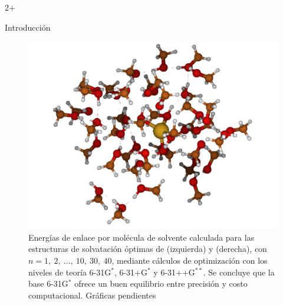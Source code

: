 \documentclass[final]{beamer}
\newlength{\sepwidth}
\newlength{\colwidth}
\begin{document}
\begin{frame}[t]
\begin{columns}[t]
\begin{column}{2\colwidth+\sepwidth}
\begin{alertblock}{Introducción}
\begin{figure}[H]
\begin{minipage}[b]{0.25\textwidth}
					\end{minipage}
					\hfill
					\begin{minipage}[b]{0.25\textwidth}
						\centering
						\includegraphics[width=\textwidth]{logos/Cu-40CH4O.png}
					\end{minipage}

					\caption{Energías de enlace por molécula de solvente calculada para las estructuras de solvatación óptimas de  (izquierda) y  (derecha), con $n = 1,\ 2,\ \ldots,\ 10,\ 30,\ 40$, mediante cálculos de optimización con los niveles de teoría 6-31G$^\ast$, 6-31+G$^\ast$ y 6-31++G$^{\ast\ast}$. Se concluye que la base 6-31G$^\ast$ ofrece un buen equilibrio entre precisión y costo computacional. Gráficas pendientes}
					\label{fig:bases}
				\end{figure}	


\end{alertblock}
\end{column}
\end{columns}
\end{frame}
\end{document}
